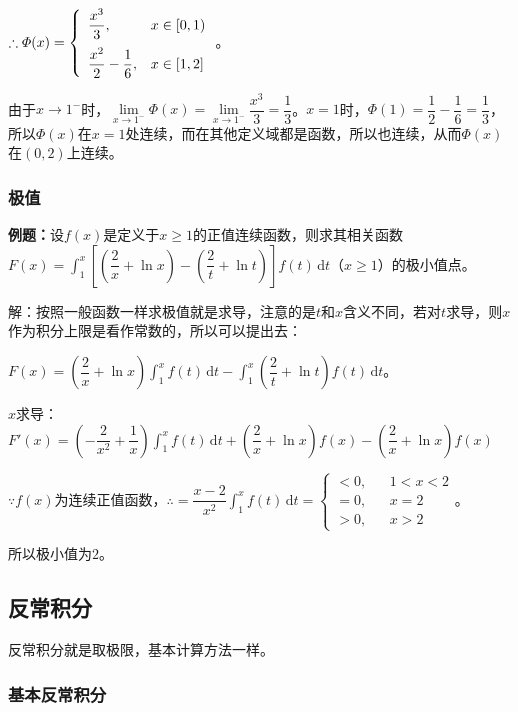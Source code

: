 \documentclass[UTF8, 12pt]{ctexart}
\begin{document}
$\therefore\varPhi(x)=\left\{\begin{array}{ll}
    \dfrac{x^3}{3}, & x\in[0,1) \medskip \\
    \dfrac{x^2}{2}-\dfrac{1}{6}, & x\in[1,2]
\end{array}\right.$。

由于$x\to1^-$时，$\lim\limits_{x\to1^-}\varPhi(x)=\lim\limits_{x\to1^-}\dfrac{x^3}{3}=\dfrac{1}{3}$。$x=1$时，$\varPhi(1)=\dfrac{1}{2}-\dfrac{1}{6}=\dfrac{1}{3}$，所以$\varPhi(x)$在$x=1$处连续，而在其他定义域都是函数，所以也连续，从而$\varPhi(x)$在$(0,2)$上连续。

\subsubsection{极值}

\textbf{例题：}设$f(x)$是定义于$x\geqslant1$的正值连续函数，则求其相关函数$F(x)=\displaystyle{\int_1^x\left[\left(\dfrac{2}{x}+\ln x\right)-\left(\dfrac{2}{t}+\ln t\right)\right]f(t)\,\textrm{d}t}$（$x\geqslant1$）的极小值点。\medskip

解：按照一般函数一样求极值就是求导，注意的是$t$和$x$含义不同，若对$t$求导，则$x$作为积分上限是看作常数的，所以可以提出去：

$F(x)=\left(\dfrac{2}{x}+\ln x\right)\displaystyle{\int_1^xf(t)\,\textrm{d}t-\int_1^x\left(\dfrac{2}{t}+\ln t\right)f(t)\,\textrm{d}t}$。

$x$求导：$F'(x)=\left(-\dfrac{2}{x^2}+\dfrac{1}{x}\right)\int_1^xf(t)\,\textrm{d}t+\left(\dfrac{2}{x}+\ln x\right)f(x)-\left(\dfrac{2}{x}+\ln x\right)f(x)$

$\because f(x)$为连续正值函数，$\therefore=\dfrac{x-2}{x^2}\int_1^xf(t)\,\textrm{d}t=\left\{\begin{array}{lcl}
    < 0, & & 1<x<2 \\
    =0, & & x=2 \\
    >0, & & x>2
\end{array}\right.$。

所以极小值为$2$。

\subsection{反常积分}

反常积分就是取极限，基本计算方法一样。

\subsubsection{基本反常积分}
\end{document}
